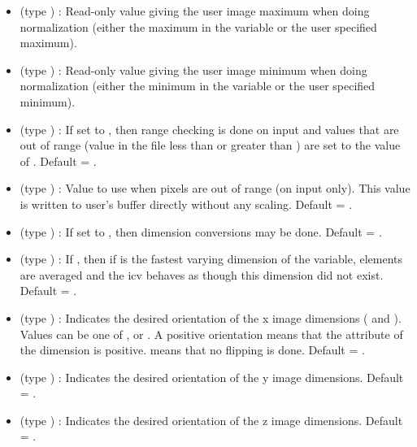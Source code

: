\documentclass{article}
\begin{document}
\begin{itemize}
\item {} (type ) : Read-only value
giving the user image maximum when doing normalization (either the
maximum in the variable or the user specified maximum).

\item {} (type ) : Read-only value
giving the user image minimum when doing normalization (either the
minimum in the variable or the user specified minimum).

\item {} (type ) : If set to 
, then range checking is done on input and values that
are out of range (value in the file less than  or
greater than ) are set to the value of
.  Default = .

\item {} (type ) : Value to
use when pixels are out of range (on input only). This value is
written to user's buffer directly without any scaling. 
Default = .

\item {} (type ) : If set to 
, then dimension conversions may be done. Default =
.

\item {} (type ) : If ,
then if  is the fastest varying dimension of
the variable, elements are averaged and the icv behaves as though this
dimension did not exist. Default = .

\item {} (type ) : Indicates the
desired orientation of the x image dimensions ( and
). Values can be one of ,
 or . A positive
orientation means that the  attribute of the dimension is
positive.  means that no flipping is done.
Default = .

\item {} (type ) : Indicates the
desired orientation of the y image dimensions. Default =
. 

\item {} (type ) : Indicates the
desired orientation of the z image dimensions. Default =
. 


\end{itemize}
\end{document}
